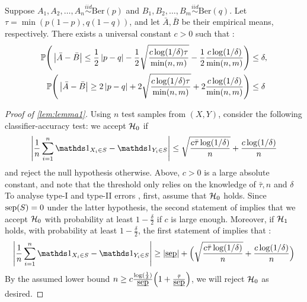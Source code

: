 \begin{lemma}\label{lem:lemma2} \citet[Lemma~8]{gerberclas}\\
Suppose $A_1,A_2,\dots,A_n \overset{iid}{\sim}\text{Ber}(p)$ and $B_1,B_2,\dots,B_m \overset{iid}{\sim} \text{Ber}(q)$. Let $\tau = \min(p(1-p),q(1-q))$, and let $\bar{A},\bar{B}$ be their empirical means, respectively. There exists a universal constant $c>0$ such that :
\begin{equation*}
    \begin{aligned}
        \P\Bigg(\left|\bar{A}-\bar{B}\right|\leq \frac{1}{2}\left|p-q\right| -\frac{1}{2}\sqrt{\frac{c\log(1/\delta)\tau}{\min(n,m)}} -\frac{1}{2}\frac{c\log(1/\delta)}{\min(n,m)} \Bigg) &\leq \delta, \\
        \P\Bigg(\left|\bar{A}-\bar{B}\right|\geq 2\left|p-q\right| + 2\sqrt{\frac{c\log(1/\delta)\tau}{\min(n,m)}} + 2\frac{c\log(1/\delta)}{\min(n,m)} \Bigg) &\leq \delta
    \end{aligned}
\end{equation*} 
\end{lemma}
\begin{proof}[Proof of \cref{lem:lemma1}]
    Using $n$ test samples from $(X,Y)$, consider the following classifier-accuracy test: we accept $\H_0$ if  
    \begin{equation*}
        \Bigg| \frac{1}{n} \sum_{i=1}^{n} \ind{X_i \in S}-\ind{Y_i \in S} \Bigg| \leq \sqrt{\frac{c\bar{\tau}\log(1/\delta)}{n}} + \frac{c\log(1/\delta)}{n}
    \end{equation*}
    and reject the null hypothesis otherwise. Above, $c>0$ is a large absolute constant, and note that the threshold only relies on the knowledge of $\bar{\tau},n$ and $\delta$\\
    To analyse type-I and type-II errors , first, assume that $\H_0$ holds. Since $\sep(S) = 0$ under the latter hypothesis, the second statement of  implies that we accept $\H_0$ with probability at least $1-\frac{\delta}{2}$ if $c$ is large enough.
    Moreover, if $\H_1$ holds, with probability at least $1-\frac{\delta}{2}$, the first statement of  implies that : 
    \begin{equation*}
        \Bigg| \frac{1}{n}\sum_{i=1}^{n} \ind{X_i \in S} -\ind{Y_i \in S} \Bigg| \geq \left| \underbar{$\sep$} \right| + \Bigl(\sqrt{\frac{c\bar{\tau}\log(1/\delta)}{n}} + \frac{c\log(1/\delta)}{n}\Bigr)
     \end{equation*}
     By the assumed lower bound $n \geq c\frac{\log(\frac{1}{\delta})}{\underbar{$\sep$}}\Bigl(1+ \frac{\bar{\tau}}{\underbar{$\sep$}}\Bigr)$, we will reject $\H_0$ as desired.
\end{proof}
